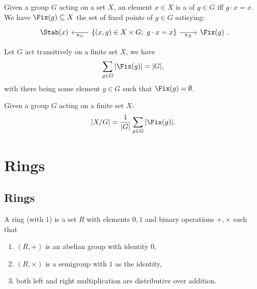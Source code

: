 \documentclass[../Year2.tex]{subfiles}
\begin{document}
\begin{definition}
    Given a group $G$ acting on a set $X$, an element $x\in X$ is a  of $g\in G$ iff $g\cdot x=x$. We have $\Fix(g)\subseteq X$ the set of fixed points of $g\in G$ satisying: \[
        \begin{tikzcd}
            \Stab(x) & \arrow[l, "\pi_G"] \{(x,g)\in X\times G; \  g\cdot x = x\} \arrow[r, swap, "\pi_X"] & \Fix(g)
        \end{tikzcd}
        \black{.}
    \]
\end{definition}

\vspace{-20pt}

\begin{theorem}
    Let $G$ act transitively on a finite set $X$, we have \[
        \sum_{g\in G}|\Fix(g)| = |G|
    \black{,}
    \] with there being some element $g\in G$ such that $\Fix(g)=\emptyset$.
\end{theorem}

\begin{corollary}
    Given a group $G$ acting on a finite set $X$: \[
        |X/G| = \frac{1}{|G|}\sum_{g\in G}|\Fix(g)|
        \black{.}
    \]
\end{corollary}

\vspace{-30pt}

\section{Rings}

\subsection{Rings}

\begin{definition}[Ring]
    A ring (with $1$) is a set $R$ with elements $0,1$ and binary operations $+,\times$ such that \begin{enumerate}
        \item $(R,+)$ is an abelian group with identity $0$,
        \item $(R,\times)$ is a semigroup with $1$ as the identity,
        \item both left and right multiplication are distributive over addition.
    \end{enumerate}
\end{definition}
\end{document}
